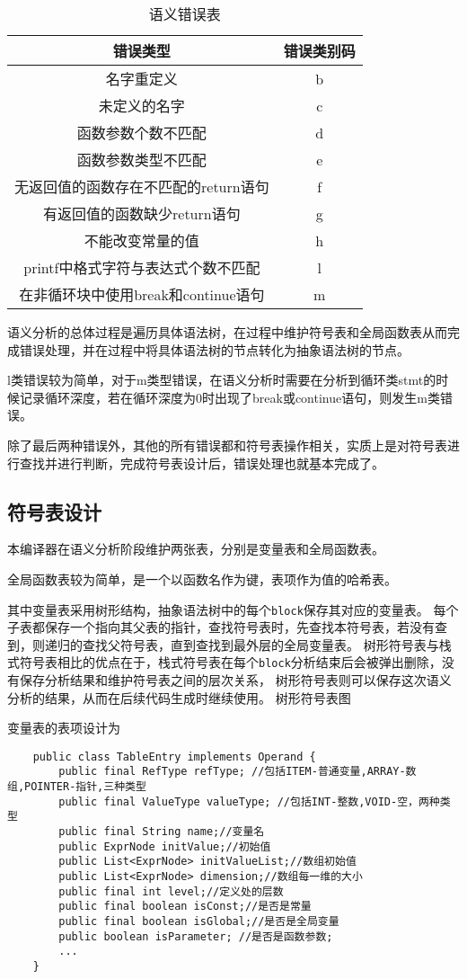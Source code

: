 \begin{table}[H] 
    \centering
    \begin{tabular}{cc}
    \toprule 
    错误类型 & 错误类别码  \\
    \midrule
    名字重定义 & b  \\
    未定义的名字 & c  \\
    函数参数个数不匹配 & d\\
    函数参数类型不匹配 & e \\
    无返回值的函数存在不匹配的return语句 & f\\
    有返回值的函数缺少return语句 & g\\
    不能改变常量的值 &h\\
    printf中格式字符与表达式个数不匹配 & l \\
    在非循环块中使用break和continue语句 & m\\
    \bottomrule %
    \end{tabular}
    \caption{语义错误表}
    \label{table:syntax}
\end{table}

语义分析的总体过程是遍历具体语法树，在过程中维护符号表和全局函数表从而完成错误处理，并在过程中将具体语法树的节点转化为抽象语法树的节点。

l类错误较为简单，对于m类型错误，在语义分析时需要在分析到循环类stmt的时候记录循环深度，若在循环深度为0时出现了break或continue语句，则发生m类错误。

除了最后两种错误外，其他的所有错误都和符号表操作相关，实质上是对符号表进行查找并进行判断，完成符号表设计后，错误处理也就基本完成了。
\subsection{符号表设计}
本编译器在语义分析阶段维护两张表，分别是变量表和全局函数表。

全局函数表较为简单，是一个以函数名作为键，表项作为值的哈希表。

其中变量表采用树形结构，抽象语法树中的每个\texttt{block}保存其对应的变量表。
每个子表都保存一个指向其父表的指针，查找符号表时，先查找本符号表，若没有查到，则递归的查找父符号表，直到查找到最外层的全局变量表。
树形符号表与栈式符号表相比的优点在于，栈式符号表在每个\texttt{block}分析结束后会被弹出删除，没有保存分析结果和维护符号表之间的层次关系，
树形符号表则可以保存这次语义分析的结果，从而在后续代码生成时继续使用。
\todo 树形符号表图

变量表的表项设计为
\begin{verbatim}
    public class TableEntry implements Operand {
        public final RefType refType; //包括ITEM-普通变量,ARRAY-数组,POINTER-指针,三种类型
        public final ValueType valueType; //包括INT-整数,VOID-空，两种类型
        public final String name;//变量名
        public ExprNode initValue;//初始值
        public List<ExprNode> initValueList;//数组初始值
        public List<ExprNode> dimension;//数组每一维的大小
        public final int level;//定义处的层数
        public final boolean isConst;//是否是常量
        public final boolean isGlobal;//是否是全局变量
        public boolean isParameter; //是否是函数参数;
        ...
    }
\end{verbatim}

